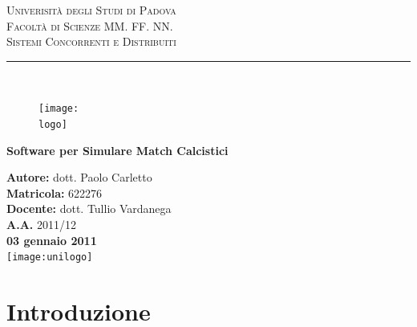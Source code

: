 \documentclass[aps,letterpaper,10pt]{article}
\newcommand{\univ}{Univerisit\`a degli Studi di Padova}
\newcommand{\faculty}{Facolt\`a di Scienze MM. FF. NN.}
\newcommand{\labtitle}{Sistemi Concorrenti e Distribuiti}
\newcommand{\titletrack}{Software per Simulare Match Calcistici}
\newcommand{\authorname}{dott. Paolo Carletto}
\newcommand{\professor}{dott. Tullio Vardanega}
\newcommand{\classno}{622276}
\newcommand{\aayear}{2011/12}
\newcommand{\logo}{images/soccerball.png}
\newcommand{\unilogo}{images/unipd-logo.png}
\begin{document}

\begin{titlepage}
\begin{center}
{\Large \textsc{\univ} \\ \vspace{4pt}}
{\Large \textsc{\faculty} \\ \vspace{4pt}}
{\Large \textsc{\labtitle} \\ \vspace{4pt}} 
\rule[13pt]{\textwidth}{1pt} \\ \vspace{55pt}

\begin{figure}[h]
	\begin{center}
		\texttt{[image: \\logo]}
	\end{center}
\label{graph}
\end{figure}
\vspace{40pt}

\Large \textbf{\titletrack} \\ \vspace{15pt}

{\large \textbf{Autore:} \authorname \\ \vspace{10pt}
\textbf{Matricola:} \classno \\ \vspace{10pt}
\textbf{Docente:} \professor \\ \vspace{10pt}
\textbf{A.A.} \aayear  \\ \vspace{10pt}
\textbf{03 gennaio 2011}} \\ \vspace{10mm}
\mbox{\texttt{[image: \\unilogo]}}
\end{center}
\end{titlepage}


\tableofcontents
\newpage

\section{Introduzione}
\end{document}
